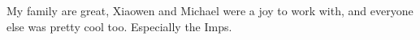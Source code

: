 My family are great, Xiaowen and Michael were a joy to work with, and everyone else was pretty cool too. Especially the Imps.